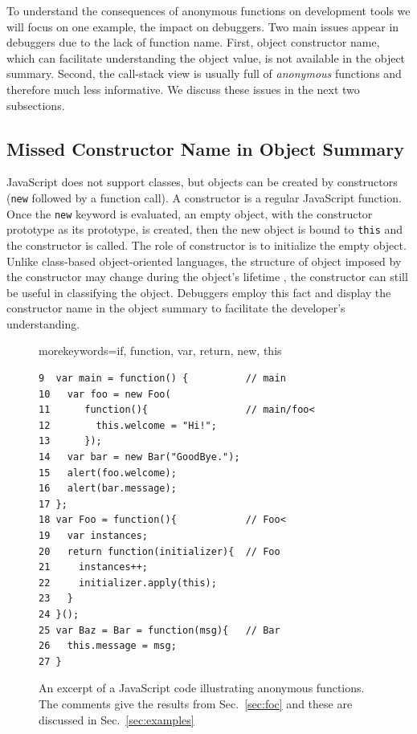 \documentclass[10pt, preprint]{sigplanconf}
\begin{document}
To understand the consequences of anonymous functions on development tools we will focus on one example, the impact on debuggers.
Two main issues appear in debuggers due to the lack of function name. First, object constructor name, which can facilitate understanding the object value, is not available in the object summary. Second, the call-stack view is usually full of \textit{anonymous} functions and therefore much less informative. We discuss these issues in the next two subsections. 
 
\subsection{Missed Constructor Name in Object Summary}
JavaScript does not support classes, but objects can be created by constructors (\verb|new| followed by a function call). A constructor is a regular JavaScript function. Once the \verb|new| keyword is evaluated, an empty object, with the constructor prototype as its prototype, is created, then the new object is bound to \verb|this| and the constructor is called. The role of constructor is to initialize the empty object. Unlike class-based object-oriented languages, the structure of object imposed by the constructor may change during the object's lifetime \cite{Richards2}, the constructor can still be useful in classifying the object.
Debuggers employ this fact and display the constructor name in the object summary to facilitate the developer's understanding. 

\begin{figure}%

\lstset{basicstyle=\scriptsize}
{morekeywords={if, function, var, return, new, this}}

\begin{lstlisting}[frame=single, language=myLang]
9  var main = function() {          // main
10   var foo = new Foo(            
11      function(){                 // main/foo<
12        this.welcome = "Hi!";
13      });
14   var bar = new Bar("GoodBye.");
15   alert(foo.welcome);
16   alert(bar.message);
17 };
18 var Foo = function(){            // Foo<    
19   var instances;
20   return function(initializer){  // Foo
21     instances++;         
22     initializer.apply(this);
23   }
24 }();
25 var Baz = Bar = function(msg){   // Bar
26   this.message = msg;
27 }
\end{lstlisting}
\caption{An excerpt of a JavaScript code illustrating anonymous functions. The comments give the results from Sec.~\ref{sec:foc} and these are discussed in Sec.~\ref{sec:examples}}
\label{js-code}
\end{figure}
\end{document}
